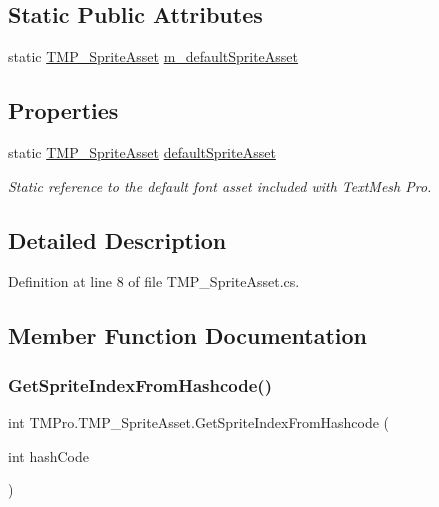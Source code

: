 \subsection*{Static Public Attributes}
\begin{DoxyCompactItemize}
\item 
static \mbox{\hyperlink{class_t_m_pro_1_1_t_m_p___sprite_asset}{T\+M\+P\+\_\+\+Sprite\+Asset}} \mbox{\hyperlink{class_t_m_pro_1_1_t_m_p___sprite_asset_a9fb75fde5a5226e9ee1f05a0aaf94e9d}{m\+\_\+default\+Sprite\+Asset}}
\end{DoxyCompactItemize}
\subsection*{Properties}
\begin{DoxyCompactItemize}
\item 
static \mbox{\hyperlink{class_t_m_pro_1_1_t_m_p___sprite_asset}{T\+M\+P\+\_\+\+Sprite\+Asset}} \mbox{\hyperlink{class_t_m_pro_1_1_t_m_p___sprite_asset_a8a0537826f6a024c10fa80ea29f957f7}{default\+Sprite\+Asset}}
\begin{DoxyCompactList}\small\item\em Static reference to the default font asset included with Text\+Mesh Pro. \end{DoxyCompactList}\end{DoxyCompactItemize}


\subsection{Detailed Description}


Definition at line 8 of file T\+M\+P\+\_\+\+Sprite\+Asset.\+cs.



\subsection{Member Function Documentation}
\mbox{\label{class_t_m_pro_1_1_t_m_p___sprite_asset_a9913527431a09b1d82e42f8365b2533c}} 
\subsubsection{\texorpdfstring{GetSpriteIndexFromHashcode()}{GetSpriteIndexFromHashcode()}}
{\footnotesize\ttfamily int T\+M\+Pro.\+T\+M\+P\+\_\+\+Sprite\+Asset.\+Get\+Sprite\+Index\+From\+Hashcode (\begin{DoxyParamCaption}\item[{int}]{hash\+Code }\end{DoxyParamCaption})}



